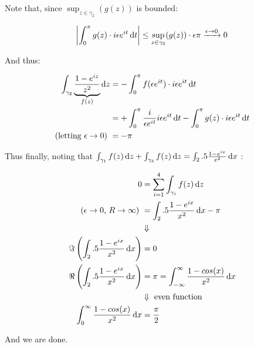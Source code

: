 \begin{example}
Note that, since $\sup_{z\in \gamma_2} (g(z))$ is bounded:

\begin{align*}
    \abs{\int_0^\pi g(z) \cdot i \epsilon e^{it} \dif t} \leq \sup_{z\in \gamma_2} (g(z)) \cdot \epsilon \pi \xrightarrow[]{\epsilon \to 0} 0
\end{align*}


And thus:

\begin{align*}
    \int_{\gamma_2} \underbrace{\frac{ 1- e^{iz}}{ z^2}}_{f(z)} \dif z &= - \int_0^{\pi} f(\epsilon e^{it} ) \cdot i \epsilon e^{it} \dif t\\
    &= + \int_0^{\pi} \frac{i}{ \epsilon e^{it}} i \epsilon e^{it} \dif t - \int_0^\pi g(z) \cdot i \epsilon e^{it} \dif t\\
   \text{(letting $\epsilon \to 0$) } &= -\pi
\end{align*}

Thus finally, noting that $\int_{\gamma_1} f(z) \dif z + \int_{\gamma_3} f(z) \dif z = \int_\R \frac{ 1- e^{ix}}{ x^2} \dif x$ :

\begin{align*}
    0 &= \sum_{i=1}^4 \int_{\gamma_i} f(z) \dif z \\
    \text{($\epsilon \to 0$, $R \to \infty$) }&= \int_\R \frac{ 1- e^{ix}}{ x^2} \dif x - \pi \\
   &\Downarrow\\
    \Im \left( \int_\R \frac{ 1- e^{ix}}{ x^2} \dif x \right) &=  0\\
    \Re \left( \int_\R \frac{ 1- e^{ix}}{ x^2} \dif x \right) &=  \pi = \int_{-\infty}^{\infty} \frac{ 1- cos(x)}{ x^2} \dif x\\
    &\Downarrow \text{ even function}\\
    \int_0^{\infty} \frac{ 1- cos(x)}{ x^2} \dif x &= \frac{\pi}{2}\\
\end{align*}

And we are done.

\end{example}





